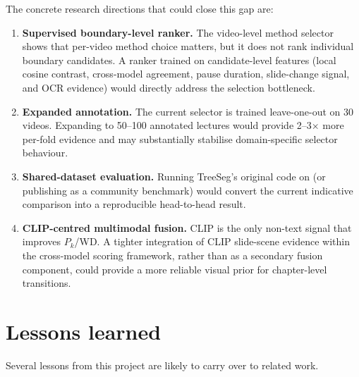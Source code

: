 The concrete research directions that could close this gap are:

\begin{enumerate}
  \item \textbf{Supervised boundary-level ranker.}
    The video-level method selector shows that per-video method choice
    matters, but it does not rank individual boundary candidates.
    A ranker trained on candidate-level features (local cosine contrast,
    cross-model agreement, pause duration, slide-change signal, and OCR
    evidence) would directly address the selection bottleneck.

  \item \textbf{Expanded annotation.}
    The current selector is trained leave-one-out on 30 videos.
    Expanding to 50--100 annotated lectures would provide 2--3$\times$ more
    per-fold evidence and may substantially stabilise domain-specific selector
    behaviour.

  \item \textbf{Shared-dataset evaluation.}
    Running TreeSeg's original code on \dataset{} (or publishing \dataset{} as
    a community benchmark) would convert the current indicative comparison
    into a reproducible head-to-head result.

  \item \textbf{CLIP-centred multimodal fusion.}
    CLIP is the only non-text signal that improves $P_k$/WD.
    A tighter integration of CLIP slide-scene evidence within the cross-model
    scoring framework, rather than as a secondary fusion component, could
    provide a more reliable visual prior for chapter-level transitions.
\end{enumerate}

\section{Lessons learned}
\label{sec:lessons}

Several lessons from this project are likely to carry over to related work.

